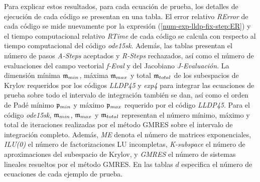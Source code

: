 Para explicar estos resultados, para cada ecuación de prueba, los detalles de ejecución de cada código se presentan en una tabla. El error relativo \textit{RError} de cada código se mide nuevamente por la expresión (\ref{num-exp-lldp-fix-step:ER}) y el tiempo computacional relativo \textit{RTime} de cada código se calcula con respecto al tiempo computacional del código \emph{ode15sk}. Además, las tablas presentan el número de pasos \textit{A-Steps} aceptados y \textit{R-Steps} rechazados, así como el número de evaluaciones del campo vectorial \textit{f-Eval} y del Jacobiano \textit{J-Evaluación}. La dimensión mínima $\mathfrak{m}_ {min}$, máxima $\mathfrak{m}_ {max}$ y total $\mathfrak{m}_{total}$ de los subespacios de Krylov requeridos por los códigos \emph{LLDP45} y \emph{exp4} para integrar las ecuaciones de prueba sobre todo el intervalo de integración  también se dan, así como el orden de Padé mínimo $\mathfrak{p}_{min}$ y máximo $\mathfrak{p}_{max}$ requerido por el código \emph{LLDP45}. Para el código \emph{ode15sk}, $\mathfrak{m}_{min}$, $\mathfrak{m}_{max}$ y $\mathfrak{m}_{total}$ representan el número mínimo, máximo y total de iteraciones realizadas por el método GMRES sobre el intervalo de integración completo. Además, \textit{ME} denota el número de matrices exponenciales, \textit{ILU(0)} el número de factorizaciones LU incompletas, \textit{K-subspace} el número de aproximaciones del subespacio de Krylov, y \textit{GMRES} el número de sistemas lineales resueltos por el método GMRES. En las tablas $d$ especifica el número de ecuaciones de cada ejemplo de prueba.

